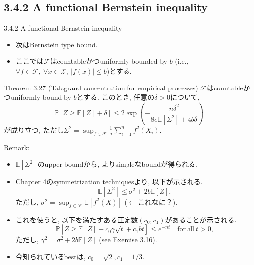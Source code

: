 \documentclass[aspectratio=169, dvipdfmx]{beamer}
\newcommand{\ex}{\mathbb{E}}
\newcommand{\bb}{\mathbb}
\newcommand{\cc}{\mathcal}
\begin{document}
\subsection{3.4.2 A functional Bernstein inequality}
\begin{frame}{3.4.2 A functional Bernstein inequality}
    \begin{itemize}
        \item 次はBernstein type bound.
        \item ここでは$\cc{F}$はcountableかつuniformly bounded by $b$ (i.e., $\forall f\in\cc{F},\ \forall x\in \cc{X},\ |f(x)|\le b$)とする.
    \end{itemize}
    \begin{block}{Theorem 3.27 (Talagrand concentration for empirical processes)}
        $\cc{F}$はcountableかつuniformly bound by $b$とする.
        このとき, 任意の$\delta > 0$について, 
        \[
            \bb{P}[Z \ge \ex[Z] +\delta]
            \le 2 \exp\left(-\frac{n\delta^2}{8e\ex[\Sigma^2] + 4b\delta} \right)
            \tag{3.83}\label{3.83}
        \]
        が成り立つ, ただし$\Sigma^2 = \sup_{f\in\cc{F}} \frac{1}{n}\sum_{i=1}^n f^2(X_i)$.
    \end{block}
\end{frame}

\begin{frame}
Remark:
\begin{itemize}
    \item $\ex[\Sigma^2]$のupper boundから, よりsimpleなboundが得られる.
    \item Chapter 4のsymmetrization techniquesより, 以下が示される.
    \[
        \ex[\Sigma^2]
        \le \sigma^2 + 2b\ex[Z],
        \tag{3.84}\label{3.84}
    \]
    ただし, $\sigma^2 = \sup_{f \in \cc{F}} \ex[f^2(X)]$ ($\leftarrow$これなに？).
    \item これを使うと, 以下を満たすある正定数$(c_0, c_1)$があることが示される.
    \[
        \bb{P}[Z \ge \ex[Z] + c_0 \gamma \sqrt{t} + c_1 bt]
        \le e^{-nt}
        \quad \mathrm{for\ all}\ t > 0,
        \tag{3.85}\label{3.85}
    \]
    ただし, $\gamma^2 = \sigma^2 + 2b\ex[Z]$ (see Exercise 3.16).
    \item 今知られているbestは, $c_0 = \sqrt{2}, c_1 = 1/3$.
\end{itemize}
\end{frame}
\end{document}
